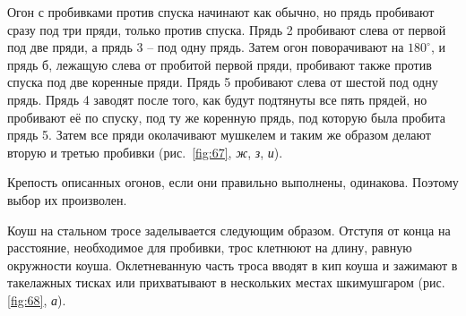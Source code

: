 \documentclass[a4paper, 12pt, twoside, final]{scrbook}
\begin{document}
Огон с пробивками против спуска начинают как обычно, но прядь пробивают сразу под три пряди, только против спуска. Прядь 2 пробивают слева от первой под две пряди, а прядь 3 \--- под одну прядь. Затем огон поворачивают на $180^\circ$, и прядь б, лежащую слева от пробитой первой пряди, пробивают также против спуска под две коренные пряди. Прядь 5 пробивают слева от шестой под одну прядь. Прядь 4 заводят после того, как будут подтянуты все пять прядей, но пробивают её по спуску, под ту же коренную прядь, под которую была пробита прядь 5. Затем все пряди околачивают мушкелем и таким же образом делают вторую и третью пробивки (рис.~\ref{fig:67}, \textit{ж}, \textit{з}, \textit{и}).

Крепость описанных огонов, если они правильно выполнены, одинакова. Поэтому выбор их произволен.

Коуш на стальном тросе заделывается следующим образом. Отступя от конца на расстояние, необходимое для пробивки, трос клетнюют на длину, равную окружности коуша. Оклетневанную часть троса вводят в кип коуша и зажимают в такелажных тисках или прихватывают в нескольких местах шкимушгаром (рис.\ref{fig:68}, \textit{а}). 
\end{document}
